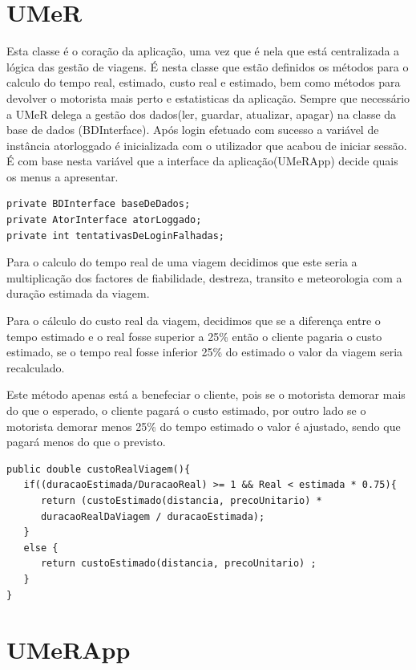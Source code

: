 \section{UMeR}

Esta classe é o coração da aplicação, uma vez que é nela que está centralizada a lógica das gestão de viagens. É nesta classe que estão definidos os métodos para o calculo do tempo real, estimado, custo real e estimado, bem como métodos para devolver o motorista mais perto e estatisticas da aplicação. Sempre que necessário a UMeR delega a gestão dos dados(ler, guardar, atualizar, apagar) na classe da base de dados (BDInterface). 
Após login efetuado com sucesso a variável de instância atorloggado é inicializada com o utilizador que acabou de iniciar sessão. É com base nesta variável que a interface da aplicação(UMeRApp) decide quais os menus a apresentar.  

\begin{verbatim}
private BDInterface baseDeDados;
private AtorInterface atorLoggado;
private int tentativasDeLoginFalhadas;
\end{verbatim}


Para o calculo do tempo real de uma viagem decidimos que este seria a multiplicação dos factores de fiabilidade, destreza, transito e meteorologia com a duração estimada da viagem. 

Para o cálculo do custo real da viagem, decidimos que se a diferença entre o tempo estimado e o real fosse superior a 25\% então o cliente pagaria o custo estimado, se o tempo real fosse inferior 25\% do estimado o valor da viagem seria recalculado. 

Este método apenas está a benefeciar o cliente, pois se o motorista demorar mais do que o esperado, o cliente pagará o custo estimado, por outro lado se o motorista demorar menos 25\% do tempo estimado o valor é ajustado, sendo que pagará menos do que o previsto. 

\begin{verbatim}
public double custoRealViagem(){
   if((duracaoEstimada/DuracaoReal) >= 1 && Real < estimada * 0.75){
      return (custoEstimado(distancia, precoUnitario) * 
      duracaoRealDaViagem / duracaoEstimada);
   }
   else {
      return custoEstimado(distancia, precoUnitario) ;
   }  
}
\end{verbatim}

\section{UMeRApp}

